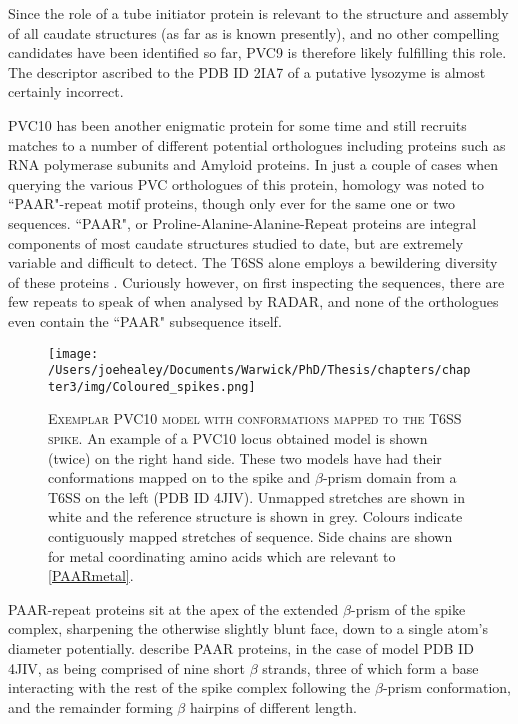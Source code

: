 Since the role of a tube initiator protein is relevant to the structure and assembly of all caudate structures (as far as is known presently), and no other compelling candidates have been identified so far, PVC9 is therefore likely fulfilling this role. The descriptor ascribed to the PDB ID 2IA7 of a putative lysozyme is almost certainly incorrect.

PVC10 has been another enigmatic protein for some time and still recruits matches to a number of different potential orthologues including proteins such as RNA polymerase subunits and Amyloid proteins. In just a couple of cases when querying the various PVC orthologues of this protein, homology was noted to ``PAAR"-repeat motif proteins, though only ever for the same one or two sequences. ``PAAR", or Proline-Alanine-Alanine-Repeat proteins are integral components of most caudate structures studied to date, but are extremely variable and difficult to detect. The T6SS alone employs a bewildering diversity of these proteins \citep{Shneider2013}. Curiously however, on first inspecting the sequences, there are few repeats to speak of when analysed by RADAR, and none of the orthologues even contain the ``PAAR" subsequence itself.


\begin{figure}[h!]
\centering
\texttt{[image: /Users/joehealey/Documents/Warwick/PhD/Thesis/chapters/chapter3/img/Coloured\_spikes.png]}
\captionsetup{singlelinecheck=off, justification=justified, font=footnotesize, aboveskip=10pt}
\caption[Putative conformations of spike tip proteins]{\textsc{\normalsize Exemplar PVC10 model with conformations mapped to the T6SS spike.}\vspace{0.1cm} \newline An example of a PVC10 locus obtained model is shown (twice) on the right hand side. These two models have had their conformations mapped on to the spike and $\beta$-prism domain from a T6SS on the left (PDB ID 4JIV). Unmapped stretches are shown in white and the reference structure is shown in grey. Colours indicate contiguously mapped stretches of sequence. Side chains are shown for metal coordinating amino acids which are relevant to \vref{PAARmetal}.}  
	\label{PAAR}
\end{figure}


PAAR-repeat proteins sit at the apex of the extended $\beta$-prism of the spike complex, sharpening the otherwise slightly blunt face, down to a single atom's diameter potentially. \cite{Shneider2013} describe PAAR proteins, in the case of model PDB ID 4JIV, as being comprised of nine short $\beta$ strands, three of which form a base interacting with the rest of the spike complex following the $\beta$-prism conformation, and the remainder forming $\beta$ hairpins of different length.

